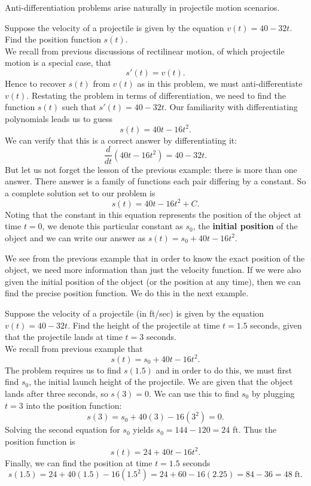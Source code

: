 \documentclass{ximera}
\begin{document}
Anti-differentiation problems arise naturally in projectile motion scenarios.
\begin{example}
Suppose the velocity of a projectile is given by the equation $v(t) = 40 - 32t$. Find the position function $s(t)$.\\
We recall from previous discussions of rectilinear motion, of which projectile motion is a special case, that
\[
s'(t) = v(t).
\]
Hence to recover $s(t)$ from $v(t)$ as in this problem, we must anti-differentiate $v(t)$.
Restating the problem in terms of differentiation, we need to find the function $s(t)$ such that $s'(t) = 40 - 32t$.
Our familiarity with differentiating polynomials leads us to guess
\[
s(t) = 40t - 16t^2.
\]
We can verify that this is a correct answer by differentiating it:
\[
\frac{d}{dt}\left(40t - 16t^2\right) = 40 - 32t.
\]
But let us not forget the lesson of the previous example: there is more than one answer.  There answer is a family of functions
each pair differing by a constant. So a complete solution set to our problem is
\[
s(t) = 40t - 16t^2 + C.
\]
Noting that the constant in this equation represents the position of the object at time $t = 0$,
we denote this particular constant as $s_0$, the \textbf{initial position} of the object and we can write our answer as 
$s(t) = s_0 + 40t - 16t^2$.


\end{example}






We see from the previous example that in order to know the exact position of the object, 
we need more information than just the velocity function.
If we were also given the initial position of the object (or the position at any time), 
then we can find the precise position function.
We do this in the next example.

\begin{example}
Suppose the velocity of a projectile (in ft/sec) is given by the equation $v(t) = 40 - 32t$. 
Find the height of the projectile at time $t = 1.5$ seconds, 
given that the projectile lands at time $t = 3$ seconds. \\

We recall from previous example that 
\[
s(t) = s_0 + 40t - 16t^2.
\]
The problem requires us to find $s(1.5)$ and in order to do this, we must first find $s_0$, 
the initial launch height of the projectile.
We are given that the object lands after three seconds, so $s(3) = 0$. We can use this to find $s_0$
by plugging $t=3$ into the position function:
\[
s(3) = s_0 + 40(3) - 16(3^2) = 0.
\]
Solving the second equation for $s_0$ yields $s_0 = 144 - 120 = 24$ ft.
Thus the position function is
\[
s(t) = 24 + 40t - 16t^2.
\]
Finally, we can find the position at time $t=1.5$ seconds
\[
s(1.5) = 24 + 40(1.5) - 16(1.5^2) = 24 + 60 - 16(2.25) = 84 - 36 = 48 \; \text{ft}.
\]
\end{example}
\end{document}
